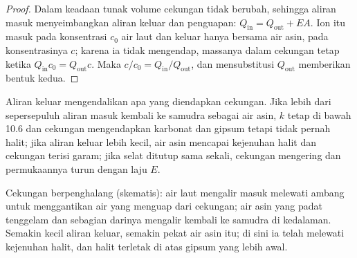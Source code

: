 \begin{proof}
Dalam keadaan tunak volume cekungan tidak berubah, sehingga aliran masuk menyeimbangkan aliran keluar dan penguapan: $Q_{\mathrm{in}} = Q_{\mathrm{out}} +
EA$. Ion itu masuk pada konsentrasi $c_0$ air laut dan keluar hanya bersama air asin, pada konsentrasinya $c$; karena ia tidak mengendap, massanya dalam cekungan tetap ketika $Q_{\mathrm{in}}c_0 = Q_{\mathrm{out}}c$. Maka $c/c_0 =
Q_{\mathrm{in}}/Q_{\mathrm{out}}$, dan mensubstitusi $Q_{\mathrm{out}}$ memberikan bentuk kedua.
\end{proof}

Aliran keluar mengendalikan apa yang diendapkan cekungan. Jika lebih dari sepersepuluh aliran masuk kembali ke samudra sebagai air asin, $k$ tetap di bawah 10.6 dan cekungan mengendapkan karbonat dan gipsum tetapi tidak pernah halit; jika aliran keluar lebih kecil, air asin mencapai kejenuhan halit dan cekungan terisi garam; jika selat ditutup sama sekali, cekungan mengering dan permukaannya turun dengan laju $E$.

\begin{omfigure}

{\small Cekungan  berpenghalang (skematis): air laut mengalir masuk melewati ambang untuk menggantikan air yang menguap dari cekungan; air asin yang padat tenggelam dan sebagian darinya mengalir kembali ke samudra di kedalaman. Semakin kecil aliran keluar, semakin pekat air asin itu; di sini ia telah melewati kejenuhan halit, dan halit terletak di atas gipsum yang lebih awal.}
\label{fig:b1:chemical-biogenic-sediments:barred}
\end{omfigure}


